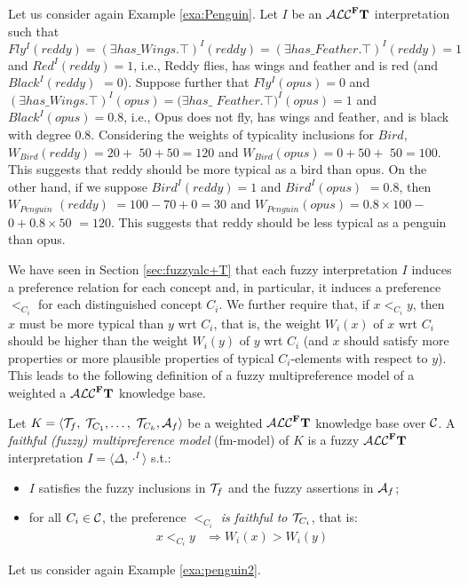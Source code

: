 \documentclass[runningheads]{llncs}
\newcommand{\tip}{{\bf T}}
\newcommand{\alcFt}{\mathcal{ALC}^{\Fe}\tip}
\newcommand {\Fe} {{\bf F}}
\newcommand {\Ri} {\Rightarrow}
\def \Ri{\Rightarrow}
\begin{document}
\begin{example} \label{exa:penguin2}
Let us consider again Example \ref{exa:Penguin}.
Let $I$ be an $\alcFt$ interpretation such that $\mathit{Fly^I(reddy)  = (\exists has\_Wings. \top)^I (reddy)= (\exists has\_Feather. \top)^I (reddy)=1}$ and  
\newline $\mathit{Red^I(reddy) =1 }$,
i.e., Reddy   flies, has wings and feather and is red (and $\mathit{Black^I(reddy)}$ $=0$). Suppose further that $\mathit{Fly^I(opus) = 0}$ and $\mathit{ (\exists has\_Wings. \top)^I (opus)= (\exists has\_}$ $ \mathit{Feather. \top)^I (opus)=1 }$ and $\mathit{ Black^I(opus) =0.8}$, i.e., Opus does not fly, has wings and feather, and is black with degree 0.8. Considering the weights of typicality inclusions for $\mathit{Bird}$,  $\mathit{W_{Bird}(reddy)= 20+}$ $\mathit{50+50=120}$ and $\mathit{W_{Bird}(opus)= 0+50+}$ $50=100$.
This suggests that reddy should be more typical as a bird than opus.
%
On the other hand, if we suppose $\mathit{Bird^I(reddy)=1}$ and $\mathit{Bird^I(opus)}$ $=0.8$, then $\mathit{W_{Penguin}}$ $\mathit{(reddy)}$ $ \mathit{= 100-70+0=30}$ and $\mathit{W_{Penguin}(opus)= 0.8 \times 100-} $ $\mathit{ 0+0.8 \times 50}$ $\mathit{=120}$. 
This suggests that reddy should be less typical as a penguin than opus.
 \end{example}
%
We have seen in Section \ref{sec:fuzzyalc+T} that each fuzzy interpretation $I$ induces a preference relation for each concept and, in particular, it induces a preference   $<_{C_i}$ for each distinguished concept $C_i$. 
We further require that, if $x  <_{C_i}  y$, 
then $x$ must be more typical than $y$ wrt $C_i$, that is, 
 the weight $W_i(x)$ of $x$ wrt $C_i$ should be higher than the weight $W_i(y)$ of $y$ wrt $C_i$ (and $x$ should satisfy more properties or more plausible properties of typical $C_i$-elements with respect to $y$). 
This leads to the following definition of a fuzzy multipreference model of a weighted a $\alcFt$  knowledge base.


\begin{definition}\label{fuzzy_fm-model} 
Let $K=\langle  {\cal T}_{f},$ $ {\cal T}_{C_1}, \ldots,$ $ {\cal T}_{C_k}, {\cal A}_f  \rangle$ be  a weighted $\alcFt$ knowledge base  over  ${\cal C }$. %
A {\em  faithful (fuzzy) multipreference model} (fm-model)  of $K$ is  a fuzzy $\alcFt$ interpretation $I=\langle \Delta, \cdot^I \rangle$  
s.t.: 
\begin{itemize}
\item
$I$  satisfies  the fuzzy inclusions in $ {\cal T}_{f}$ and the fuzzy assertions in ${\cal A}_f$;
\item 
for all $C_i\in {\cal C}$,  the preference {\em $<_{C_i}$   is faithful to $ {\cal T}_{C_i}$}, that is: 
\begin{align}\label{pref_rel_fuzzy}
x  <_{C_i}  y & \Ri W_i(x) > W_i(y)  
\end{align}
\end{itemize}
\end{definition}
Let us consider again Example \ref{exa:penguin2}.
\end{document}
